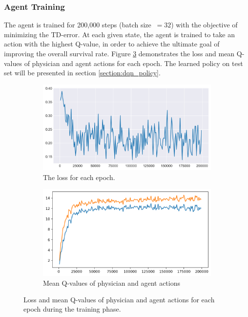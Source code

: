 \documentclass[letterpaper]{article}
\begin{document}
\subsubsection{Agent Training}

The agent is trained for 200,000 steps (batch size $\ = 32$) with the objective of minimizing the TD-error. At each given state, the agent is trained to take an action with the highest Q-value, in order to achieve the ultimate goal of improving the overall survival rate. Figure \ref{fig:dqn_train} demonstrates the loss and mean Q-values of physician and agent actions for each epoch. The learned policy on test set will be presented in section \ref{section:dqn_policy}.

\begin{figure}[H]
  \centering
  \begin{subfigure}{0.5\linewidth}
  \centering
  \includegraphics[width=0.9\linewidth]{figures/dqn_loss.png}\hfill
  \caption{The loss for each epoch.}
  \label{fig:dqn_loss}
  \end{subfigure}%
  \begin{subfigure}{0.5\linewidth}
  \centering
  \includegraphics[width=0.9\linewidth]{figures/meanq.png}\hfill
  \caption{Mean Q-values of physician and agent actions}
  \label{fig:dqn_mean_q}
  \end{subfigure}
  \caption{Loss and mean Q-values of physician and agent actions for each epoch during the training phase.}
  \label{fig:dqn_train}
\end{figure}
\end{document}
